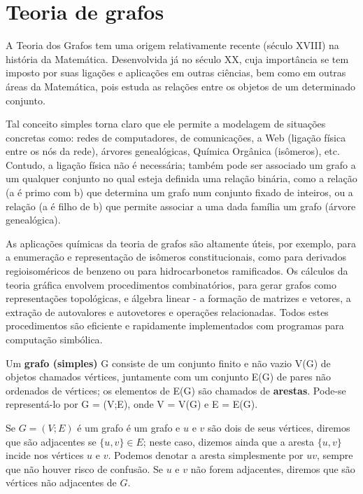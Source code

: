 \chapter{Teoria de grafos} \label{ap:graph}

A Teoria dos Grafos tem uma origem relativamente recente (século XVIII) na
história da Matemática. Desenvolvida já no século XX, cuja importância se tem
imposto por suas ligações e aplicações em outras ciências, bem como em outras
áreas da Matemática, pois estuda as relações entre os objetos de um determinado conjunto\autocite{neto2016topicos, soares2014introduccao}.

Tal conceito simples torna claro que ele permite a modelagem de situações concretas como: redes de computadores, de comunicações, a Web (ligação física entre
os nós da rede), árvores genealógicas, Química Orgânica (isômeros), etc.
Contudo, a ligação física não é necessária; também pode ser associado um grafo
a um qualquer conjunto no qual esteja definida uma relação binária, como a relação
(a é primo com b) que determina um grafo num conjunto fixado de inteiros, ou a
relação (a é filho de b) que permite associar a uma dada família um grafo (árvore
genealógica).


As aplicações químicas da teoria de grafos são altamente úteis, por exemplo, para a enumeração e representação de isômeros constitucionais, como para derivados regioisoméricos de benzeno ou para hidrocarbonetos ramificados. Os cálculos da teoria gráfica envolvem procedimentos combinatórios, para gerar grafos como representações topológicas, e álgebra linear - a formação de matrizes e vetores, a extração de autovalores e  autovetores e operações relacionadas. Todos estes procedimentos são eficiente e rapidamente implementados com programas para computação simbólica\autocite{allinger2010molecular}.

\begin{definition}
Um \textbf{grafo (simples)} G consiste de um conjunto finito e não vazio
V(G) de objetos chamados vértices, juntamente com um conjunto E(G) de pares
não ordenados de vértices; os elementos de E(G) são chamados de \textbf{arestas}. Pode-se representá-lo por G = (V;E), onde V = V(G) e E = E(G).
\end{definition}

Se $G = (V;E)$ é um grafo é um grafo e $u$ e $v$ são dois de seus vértices, diremos que são adjacentes se $\{u,v\} \in E$; neste caso, dizemos ainda que a aresta $\{u,v\}$ incide nos vértices $u$ e $v$. Podemos denotar a aresta simplesmente por $uv$, sempre que não houver risco de confusão. Se $u$ e $v$ não forem adjacentes, diremos que são vértices não adjacentes de $G$.

